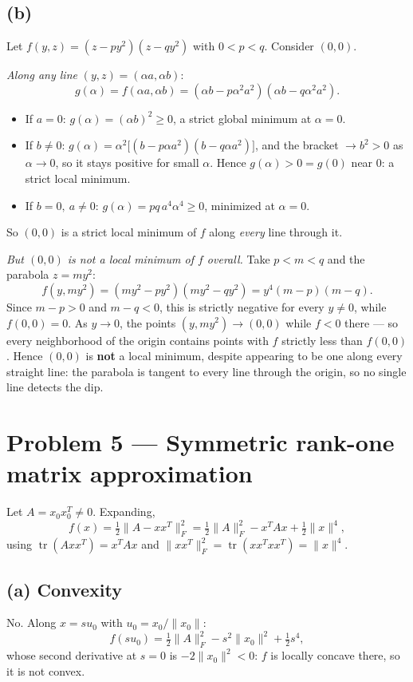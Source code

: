 \documentclass[11pt]{article}
\newcommand{\tr}{\operatorname{tr}}
\begin{document}
\subsection*{(b)}
Let $f(y,z) = (z-py^2)(z-qy^2)$ with $0<p<q$. Consider $(0,0)$.

\emph{Along any line} $(y,z)=(\alpha a,\alpha b)$:
\[
g(\alpha) = f(\alpha a,\alpha b) = (\alpha b - p\alpha^2a^2)(\alpha b - q\alpha^2 a^2).
\]
\begin{itemize}[leftmargin=1.5em]
\item If $a=0$: $g(\alpha)=(\alpha b)^2\ge0$, a strict global minimum at $\alpha=0$.
\item If $b\ne0$: $g(\alpha)=\alpha^2\big[(b-p\alpha a^2)(b-q\alpha a^2)\big]$, and the bracket $\to b^2>0$ as $\alpha\to0$, so it stays positive for small $\alpha$. Hence $g(\alpha)>0=g(0)$ near $0$: a strict local minimum.
\item If $b=0,\ a\ne0$: $g(\alpha)=pq\,a^4\alpha^4\ge0$, minimized at $\alpha=0$.
\end{itemize}
So $(0,0)$ is a strict local minimum of $f$ along \emph{every} line through it.

\emph{But $(0,0)$ is not a local minimum of $f$ overall.} Take $p<m<q$ and the parabola $z=my^2$:
\[
f(y,my^2) = (my^2-py^2)(my^2-qy^2) = y^4(m-p)(m-q).
\]
Since $m-p>0$ and $m-q<0$, this is strictly negative for every $y\ne0$, while $f(0,0)=0$. As $y\to0$, the points $(y,my^2)\to(0,0)$ while $f<0$ there --- so every neighborhood of the origin contains points with $f$ strictly less than $f(0,0)$. Hence $(0,0)$ is \textbf{not} a local minimum, despite appearing to be one along every straight line: the parabola is tangent to every line through the origin, so no single line detects the dip.

\section*{Problem 5 --- Symmetric rank-one matrix approximation}

Let $A = x_0x_0^T \ne 0$. Expanding,
\[
f(x) = \tfrac12\|A-xx^T\|_F^2 = \tfrac12\|A\|_F^2 - x^TAx + \tfrac12\|x\|^4,
\]
using $\tr(Axx^T)=x^TAx$ and $\|xx^T\|_F^2=\tr(xx^Txx^T)=\|x\|^4$.

\subsection*{(a) Convexity}
No. Along $x=su_0$ with $u_0=x_0/\|x_0\|$:
\[
f(su_0) = \tfrac12\|A\|_F^2 - s^2\|x_0\|^2 + \tfrac12 s^4,
\]
whose second derivative at $s=0$ is $-2\|x_0\|^2<0$: $f$ is locally concave there, so it is not convex.
\end{document}
